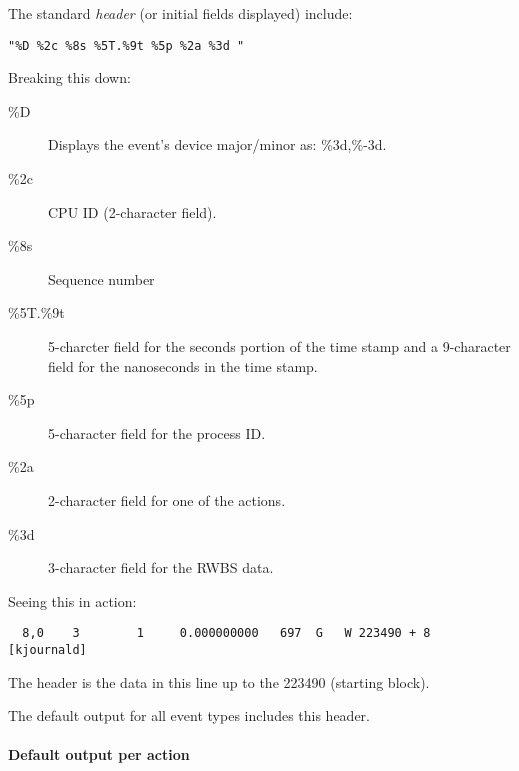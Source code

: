 \documentclass{article}
\begin{document}
The standard \emph{header} (or initial fields displayed) include:

\begin{verbatim}
"%D %2c %8s %5T.%9t %5p %2a %3d "
\end{verbatim}

Breaking this down:

\begin{description}
  \item[\%D] Displays the event's device major/minor as: \%3d,\%-3d.
  \item[\%2c] CPU ID (2-character field).
  \item[\%8s] Sequence number
  \item[\%5T.\%9t] 5-charcter field for the seconds portion of the
  time stamp and a 9-character field for the nanoseconds in the time stamp.
  \item[\%5p] 5-character field for the process ID.
  \item[\%2a] 2-character field for one of the actions.
  \item[\%3d] 3-character field for the RWBS data.
\end{description}

Seeing this in action:

\begin{verbatim}
  8,0    3        1     0.000000000   697  G   W 223490 + 8 [kjournald]
\end{verbatim}

The header is the data in this line up to the 223490 (starting block). 

The default output for all event types includes this header.

\paragraph{Default output per action}
\end{document}
